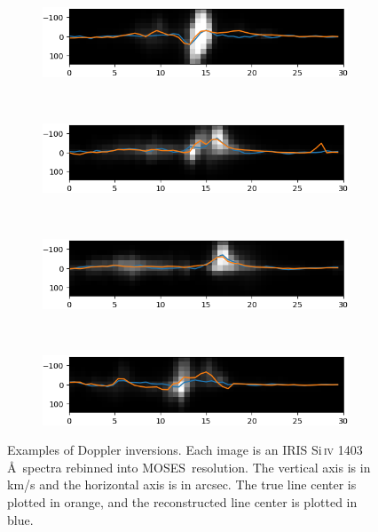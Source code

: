 \documentclass[10pt,letterpaper]{article}
\newcommand{\SiIV}{Si\,\textsc{iv} 1403 \AA}
\newcommand{\MOSES}{\ac{MOSES}}
\begin{document}
				\begin{figure}[h!]
					\centering
					\begin{subfigure}[t]{0.49\textwidth}
						\centering
						\includegraphics[width=\textwidth]{fig/doppler_1182}
					\end{subfigure}
					~ 
					\begin{subfigure}[t]{0.49\textwidth}
						\centering
						\includegraphics[width=\textwidth]{fig/doppler_1225}
					\end{subfigure}
					~ 
					\begin{subfigure}[t]{0.49\textwidth}
						\centering
						\includegraphics[width=\textwidth]{fig/doppler_1263}
					\end{subfigure}
					~ 
					\begin{subfigure}[t]{0.49\textwidth}
						\centering
						\includegraphics[width=\textwidth]{fig/doppler_1343}
					\end{subfigure}
					\caption{Examples of Doppler inversions. Each image is an IRIS \SiIV\ spectra rebinned into \MOSES\ resolution. The vertical axis is in km/s and the horizontal axis is in arcsec. The true line center is plotted in orange, and the reconstructed line center is plotted in blue.}
					\label{dopp_ex}
				\end{figure}
\end{document}
